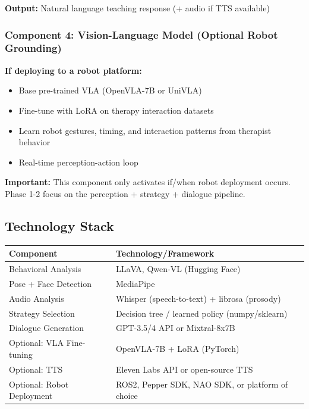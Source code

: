 \documentclass[12pt, a4paper]{article}
\begin{document}
\textbf{Output:} Natural language teaching response (+ audio if TTS available)

\subsubsection{Component 4: Vision-Language Model (Optional Robot Grounding)}

\textbf{If deploying to a robot platform:}
\begin{itemize}
    \item Base pre-trained VLA (OpenVLA-7B or UniVLA)
    \item Fine-tune with LoRA on therapy interaction datasets
    \item Learn robot gestures, timing, and interaction patterns from therapist behavior
    \item Real-time perception-action loop
\end{itemize}

\textbf{Important:} This component only activates if/when robot deployment occurs. Phase 1-2 focus on the perception + strategy + dialogue pipeline.

\subsection{Technology Stack}

\begin{table}[h]
\centering
\begin{tabular}{|l|l|}
\hline
\textbf{Component} & \textbf{Technology/Framework} \\
\hline
Behavioral Analysis & LLaVA, Qwen-VL (Hugging Face) \\
\hline
Pose + Face Detection & MediaPipe \\
\hline
Audio Analysis & Whisper (speech-to-text) + librosa (prosody) \\
\hline
Strategy Selection & Decision tree / learned policy (numpy/sklearn) \\
\hline
Dialogue Generation & GPT-3.5/4 API or Mixtral-8x7B \\
\hline
Optional: VLA Fine-tuning & OpenVLA-7B + LoRA (PyTorch) \\
\hline
Optional: TTS & Eleven Labs API or open-source TTS \\
\hline
Optional: Robot Deployment & ROS2, Pepper SDK, NAO SDK, or platform of choice \\
\hline
\end{tabular}
\end{table}
\end{document}

